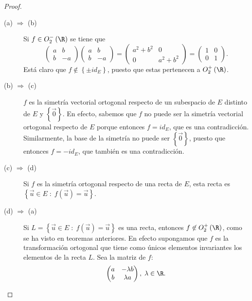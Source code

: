 \begin{proof}
\begin{description}
\item[(a) $\displaystyle \Rightarrow $ (b)] Si $\displaystyle f \in O^{-}_{2}\left(\R\right) $ se tiene que 
	\[\begin{pmatrix} a & b \\ b & - a \end{pmatrix}\begin{pmatrix} a & b \\ b & - a \end{pmatrix} = \begin{pmatrix} a^{2}+b^{2} & 0 \\ 0 & a^{2} + b^{2} \end{pmatrix} = \begin{pmatrix} 1 & 0 \\ 0 & 1 \end{pmatrix} .\]
	Está claro que $\displaystyle f \not\in \left\{ \pm id _{E}\right\}  $, puesto que estas pertenecen a $\displaystyle O^{+ }_{2}\left(\R\right) $.
\item[(b) $\displaystyle \Rightarrow $ (c)] $\displaystyle f $ es la simetría vectorial ortogonal respecto de un subespacio de $\displaystyle E $ distinto de $\displaystyle E $ y $\displaystyle \left\{ \vec{0}\right\}  $. En efecto, sabemos que $\displaystyle f $ no puede ser la simetría vectorial ortogonal respecto de $\displaystyle E $ porque entonces $\displaystyle f = id _{E} $, que es una contradicción. Similarmente, la base de la simetría no puede ser $\displaystyle \left\{ \vec{0}\right\}  $, puesto que entonces $\displaystyle f = - id _{E} $, que también es una contradicción.
\item[(c) $\displaystyle \Rightarrow $ (d)] Si $\displaystyle f $ es la simetría ortogonal respecto de una recta de $\displaystyle E $, esta recta es $\displaystyle \left\{ \vec{u} \in E \; : \; f\left(\vec{u}\right) = \vec{u}\right\}  $.
\item[(d) $\displaystyle \Rightarrow $ (a)] Si $\displaystyle L = \left\{ \vec{u} \in E \; : \; f\left(\vec{u}\right) = \vec{u}\right\}  $ es una recta, entonces $\displaystyle f \not\in O^{+}_{2}\left(\R\right) $, como se ha visto en teoremas anteriores. En efecto supongamos que $\displaystyle f $ es la transformación ortogonal que tiene como únicos elementos invariantes los elementos de la recta $\displaystyle L $. Sea la matriz de $\displaystyle f $:
	\[\begin{pmatrix} a & - \lambda b \\ b & \lambda a \end{pmatrix}, \; \lambda \in \R .\]

\end{description}
\end{proof}
